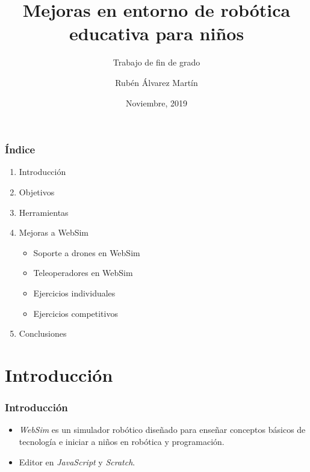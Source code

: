 \documentclass[xcolor={table}]{beamer}
\title{Mejoras en entorno de robótica  educativa para niños}
\subtitle{Trabajo de fin de grado}
\author{Rubén Álvarez Martín}
\date{Noviembre, 2019}
\begin{document}
	\setcounter{showProgressBar}{0}
	\setcounter{showSlideNumbers}{0}

	\frame{\titlepage}

	\begin{frame}
		\frametitle{Índice}
		\begin{enumerate}
			\item Introducción \\ \textcolor{ExecusharesGrey}{}
		 \textcolor{ExecusharesGrey}{\footnotesize\hspace{1em}}
 		\item Objetivos \\ \textcolor{ExecusharesGrey}{}
		 \textcolor{ExecusharesGrey}{\footnotesize\hspace{1em}}
			\item Herramientas \\ \textcolor{ExecusharesGrey}{\footnotesize\hspace{1em}}
			\item Mejoras a WebSim  \textcolor{ExecusharesGrey}{
			\begin{itemize}
			    \item Soporte a drones en WebSim
			    \item Teleoperadores en WebSim
			    \item Ejercicios individuales
			    \item Ejercicios competitivos  \\
			\end{itemize}} 
			\item Conclusiones  \textcolor{ExecusharesGrey}{\footnotesize\hspace{1em}}
		\end{enumerate}
	\end{frame}

	\setcounter{framenumber}{0}
	\setcounter{showProgressBar}{1}
	\setcounter{showSlideNumbers}{1}
	\section{Introducción}
		\begin{frame}
			\frametitle{Introducción}
			\begin{itemize}
			    \item \textit{WebSim} es un simulador robótico diseñado para enseñar conceptos básicos de tecnología e iniciar a niños en robótica y programación.
			    \item Editor en \textit{JavaScript} y \textit{Scratch}.
			\end{itemize}
		\end{frame}
\end{document}

